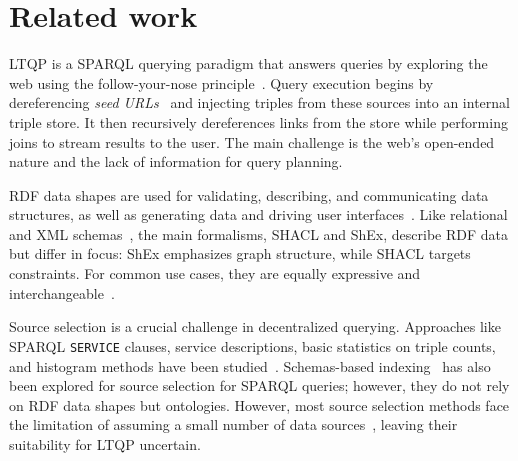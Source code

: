\section{Related work}

LTQP is a SPARQL querying paradigm that answers queries by exploring the web using the follow-your-nose principle~\cite{hartig2016walking}.
Query execution begins by dereferencing \emph{seed URLs}~\cite{hartig2016walking} and injecting triples from these sources into an internal triple store.
It then recursively dereferences links from the store while performing joins to stream results to the user.
The main challenge is the web's open-ended nature and the lack of information for query planning.

RDF data shapes are used for validating, describing, and communicating data structures, as well as generating data and driving user interfaces~\cite{Gayo2018a,Gayo2018}.
Like relational and XML schemas~\cite{Boneva2017}, the main formalisms, SHACL and ShEx, describe RDF data but differ in focus: ShEx emphasizes graph structure, while SHACL targets constraints.
For common use cases, they are equally expressive and interchangeable~\cite{Gayo2018c}.

Source selection is a crucial challenge in decentralized querying.
Approaches like SPARQL \texttt{SERVICE} clauses, service descriptions, basic statistics on triple counts, and histogram methods have been studied~\cite{hose2012towards, Harth2010}.
Schemas-based indexing~\cite{Stuckenschmidt2004} has also been explored for source selection for SPARQL queries; however, they do not rely on RDF data shapes but ontologies. 
However, most source selection methods face the limitation of assuming a small number of data sources~\cite{Harth2010}, leaving their suitability for LTQP uncertain.

